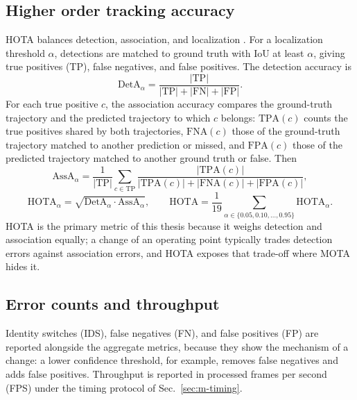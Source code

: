 \subsection{Higher order tracking accuracy}
HOTA balances detection, association, and localization \cite{luiten2021hota}. For a localization threshold $\alpha$, detections are matched to ground truth with IoU at least $\alpha$, giving true positives (TP), false negatives, and false positives. The detection accuracy is
\begin{equation}
\mathrm{DetA}_\alpha = \frac{|\mathrm{TP}|}{|\mathrm{TP}| + |\mathrm{FN}| + |\mathrm{FP}|}.
\label{eq:m-deta}
\end{equation}
For each true positive $c$, the association accuracy compares the ground-truth trajectory and the predicted trajectory to which $c$ belongs: $\mathrm{TPA}(c)$ counts the true positives shared by both trajectories, $\mathrm{FNA}(c)$ those of the ground-truth trajectory matched to another prediction or missed, and $\mathrm{FPA}(c)$ those of the predicted trajectory matched to another ground truth or false. Then
\begin{equation}
\mathrm{AssA}_\alpha = \frac{1}{|\mathrm{TP}|} \sum_{c\in\mathrm{TP}} \frac{|\mathrm{TPA}(c)|}{|\mathrm{TPA}(c)| + |\mathrm{FNA}(c)| + |\mathrm{FPA}(c)|},
\label{eq:m-assa}
\end{equation}
\begin{equation}
\mathrm{HOTA}_\alpha = \sqrt{\mathrm{DetA}_\alpha \cdot \mathrm{AssA}_\alpha}, \qquad
\mathrm{HOTA} = \frac{1}{19} \sum_{\alpha \in \{0.05, 0.10, \ldots, 0.95\}} \mathrm{HOTA}_\alpha .
\label{eq:m-hota}
\end{equation}
HOTA is the primary metric of this thesis because it weighs detection and association equally; a change of an operating point typically trades detection errors against association errors, and HOTA exposes that trade-off where MOTA hides it.

\subsection{Error counts and throughput}
Identity switches (IDS), false negatives (FN), and false positives (FP) are reported alongside the aggregate metrics, because they show the mechanism of a change: a lower confidence threshold, for example, removes false negatives and adds false positives. Throughput is reported in processed frames per second (FPS) under the timing protocol of Sec.~\ref{sec:m-timing}.

